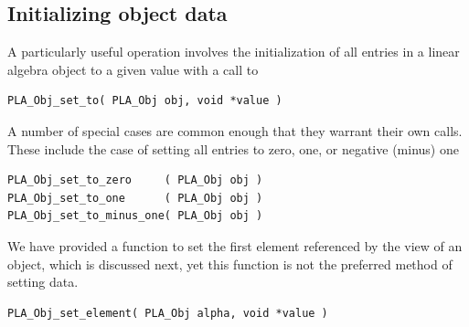



\subsection{Initializing object data}

A particularly useful operation involves the initialization of all entries
in a linear algebra object to a given value with a call to
\begin{FlaSpec}
\begin{verbatim}
PLA_Obj_set_to( PLA_Obj obj, void *value )
\end{verbatim}
\end{FlaSpec}

A number of special cases are common enough that they warrant their own calls.  These include
the case of setting all entries to zero, one, or negative (minus) one
\begin{FlaSpec}
\begin{verbatim}
PLA_Obj_set_to_zero     ( PLA_Obj obj )
PLA_Obj_set_to_one      ( PLA_Obj obj )
PLA_Obj_set_to_minus_one( PLA_Obj obj )
\end{verbatim}
\end{FlaSpec}

We have provided a function to set the first element
referenced by the view of an object, which is discussed next,
yet this function is not the preferred method of setting data.
\begin{FlaSpec}
\begin{verbatim}
PLA_Obj_set_element( PLA_Obj alpha, void *value )
\end{verbatim}
\end{FlaSpec}




